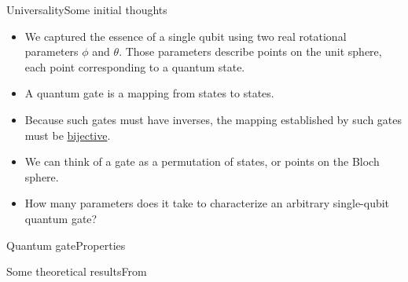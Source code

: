 
\begin{frame}{Universality}{Some initial thoughts}

\begin{itemize}[<+->]
    \item We captured the essence of a single qubit using two real rotational parameters $\phi$ and $\theta$.  Those parameters describe points on the unit sphere, each point corresponding to a quantum state.
    \item A quantum gate is a mapping from states to states.
    \item Because such gates must have inverses, the mapping established by such gates must be \href{https://en.wikipedia.org/wiki/Bijection}{bijective}.
    \item We can think of a gate as a permutation of states, or points on the Bloch sphere.
    \item How many parameters does it take to characterize an arbitrary single-qubit quantum gate?
\end{itemize}

    
\end{frame}

\begin{frame}{Quantum gate}{Properties}

\BigSkip{}
    
\end{frame}

\begin{frame}{Some theoretical results}{From \Kaye{}}
\end{frame}

